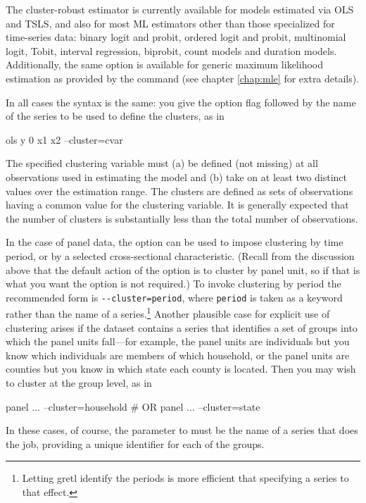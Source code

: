The cluster-robust estimator is currently available for models
estimated via OLS and TSLS, and also for most ML estimators other than
those specialized for time-series data: binary logit and probit,
ordered logit and probit, multinomial logit, Tobit, interval
regression, biprobit, count models and duration models. Additionally,
the same option is available for generic maximum likelihood estimation
as provided by the  command (see chapter \ref{chap:mle} for
extra details).

In all cases the syntax is the same: you give the option flag
 followed by the name of the series to be used to
define the clusters, as in
%
\begin{code}
ols y 0 x1 x2 --cluster=cvar
\end{code}
%
The specified clustering variable must (a) be defined (not missing) at
all observations used in estimating the model and (b) take on at least
two distinct values over the estimation range. The clusters are
defined as sets of observations having a common value for the
clustering variable. It is generally expected that the number of
clusters is substantially less than the total number of observations.

In the case of panel data, the  option can be used to
impose clustering by time period, or by a selected cross-sectional
characteristic. (Recall from the discussion above that the default
action of the  option is to cluster by panel unit, so
if that is what you want the  option is not required.)
To invoke clustering by period the recommended form is
\verb|--cluster=period|, where \texttt{period} is taken as a keyword
rather than the name of a series.\footnote{Letting gretl identify the
  periods is more efficient that specifying a series to that effect.}
Another plausible case for explicit use of clustering arises if the
dataset contains a series that identifies a set of groups into which
the panel units fall---for example, the panel units are individuals
but you know which individuals are members of which household, or the
panel units are counties but you know in which state each county is
located. Then you may wish to cluster at the group level, as in
\begin{code}
panel ... --cluster=household
# OR
panel ... --cluster=state
\end{code}
In these cases, of course, the parameter to  must be
the name of a series that does the job, providing a unique identifier
for each of the groups.

